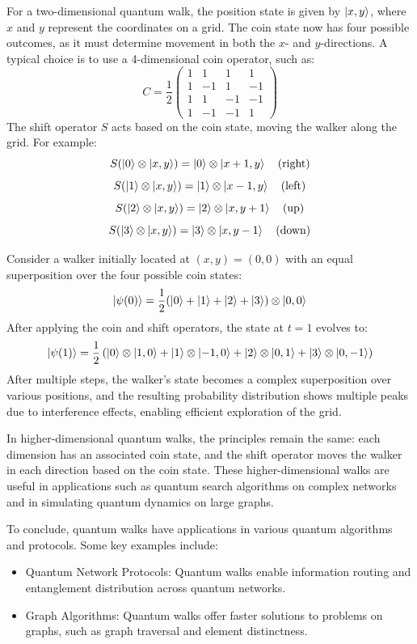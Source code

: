 \documentclass{article}
\begin{document}
		For a two-dimensional quantum walk, the position state is given by \( \ket{x, y} \), where \( x \) and \( y \) represent the coordinates on a grid. The coin state now has four possible outcomes, as it must determine movement in both the \( x \)- and \( y \)-directions. A typical choice is to use a 4-dimensional coin operator, such as:
		\[
		C = \frac{1}{2} \begin{pmatrix} 1 & 1 & 1 & 1 \\ 1 & -1 & 1 & -1 \\ 1 & 1 & -1 & -1 \\ 1 & -1 & -1 & 1 \end{pmatrix}
		\]
		The shift operator \( S \) acts based on the coin state, moving the walker along the grid. For example:
		\[
		S(\ket{0} \otimes \ket{x, y}) = \ket{0} \otimes \ket{x+1, y} \quad \text{(right)}
		\]
		\[
		S(\ket{1} \otimes \ket{x, y}) = \ket{1} \otimes \ket{x-1, y} \quad \text{(left)}
		\]
		\[
		S(\ket{2} \otimes \ket{x, y}) = \ket{2} \otimes \ket{x, y+1} \quad \text{(up)}
		\]
		\[
		S(\ket{3} \otimes \ket{x, y}) = \ket{3} \otimes \ket{x, y-1} \quad \text{(down)}
		\]
		
		Consider a walker initially located at \( (x, y) = (0, 0) \) with an equal superposition over the four possible coin states:
		\[
		\ket{\psi(0)} = \frac{1}{2} (\ket{0} + \ket{1} + \ket{2} + \ket{3}) \otimes \ket{0, 0}
		\]
		After applying the coin and shift operators, the state at \( t = 1 \) evolves to:
		\[
		\ket{\psi(1)} = \frac{1}{2} \left( \ket{0} \otimes \ket{1, 0} + \ket{1} \otimes \ket{-1, 0} + \ket{2} \otimes \ket{0, 1} + \ket{3} \otimes \ket{0, -1} \right)
		\]
		After multiple steps, the walker’s state becomes a complex superposition over various positions, and the resulting probability distribution shows multiple peaks due to interference effects, enabling efficient exploration of the grid.
		
		In higher-dimensional quantum walks, the principles remain the same: each dimension has an associated coin state, and the shift operator moves the walker in each direction based on the coin state. These higher-dimensional walks are useful in applications such as quantum search algorithms on complex networks and in simulating quantum dynamics on large graphs.

		To conclude, quantum walks have applications in various quantum algorithms and protocols. Some key examples include:
		\begin{itemize}
			\item Quantum Network Protocols: Quantum walks enable information routing and entanglement distribution across quantum networks.
			\item Graph Algorithms: Quantum walks offer faster solutions to problems on graphs, such as graph traversal and element distinctness.\cite{portugal}
		\end{itemize}
\end{document}
